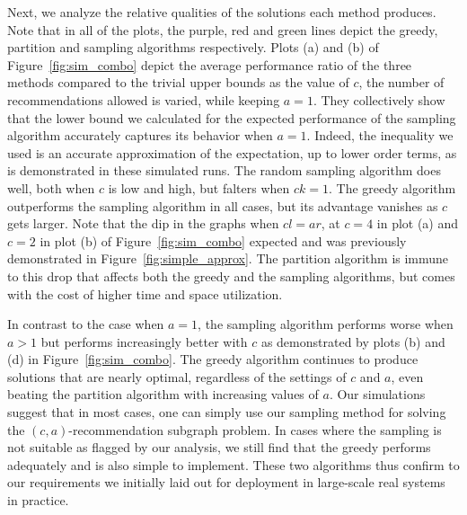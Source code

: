Next, we analyze the relative qualities of the solutions each method
produces. Note that in all of the plots, the purple, red and green lines depict the 
greedy, partition and sampling algorithms respectively.
 Plots (a) and (b) of Figure~\ref{fig:sim_combo} depict the
average performance ratio of the three methods compared to the trivial
upper bounds as the value of $c$, the number of recommendations
allowed is varied, while keeping $a = 1$.
They collectively show that the lower bound we calculated for the
expected performance of the sampling algorithm accurately captures its
behavior when $a=1$. Indeed, the inequality
we used is an accurate approximation of the expectation, up to lower
order terms, as is demonstrated in these simulated runs.  The random
sampling algorithm does well, both when $c$ is low and high, but
falters when $ck=1$. The greedy algorithm outperforms the
sampling algorithm in all cases, but its advantage vanishes as
$c$ gets larger. Note that the dip in the graphs when $cl=ar$, at
$c=4$ in plot (a) and $c=2$ in plot (b) of Figure~\ref{fig:sim_combo}
expected and was previously demonstrated in
Figure~\ref{fig:simple_approx}.  The partition algorithm is immune to
this drop that affects both the greedy and the sampling algorithms,
but comes with the cost of higher time and space utilization. 



In contrast to the case when $a=1$, the sampling algorithm
performs worse when $a>1$ but performs increasingly better with $c$ as
demonstrated by plots (b) and (d) in Figure~\ref{fig:sim_combo}. The greedy
algorithm continues to produce solutions that are nearly optimal,
regardless of the settings of $c$ and $a$, even beating the
partition algorithm with increasing values of $a$. Our simulations
suggest that in most cases, one can simply use our sampling method for
solving the $(c, a)$-recommendation subgraph problem. In cases where the sampling is not suitable as flagged
by our analysis, we still find that the greedy performs adequately and
is also simple to implement. These two algorithms thus confirm to our
requirements we initially laid out for deployment in large-scale real
systems in practice.


